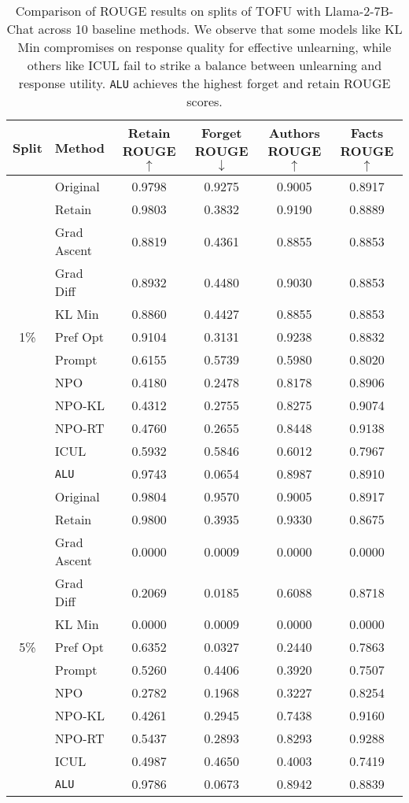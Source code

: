 \begin{table*}
    \centering
    \caption{Comparison of ROUGE results on splits of TOFU with Llama-2-7B-Chat across 10 baseline methods. We observe that some models like KL Min compromises on response quality for effective unlearning, while others like ICUL fail to strike a balance between unlearning and response utility. \texttt{ALU} achieves the highest forget and retain ROUGE scores.}
    \begin{tabular}{cl|cccc}
    \toprule
    \textbf{Split}&\textbf{Method}&\textbf{Retain ROUGE} $\uparrow$ &\textbf{Forget ROUGE} $\downarrow$ &\textbf{Authors ROUGE} $\uparrow$ &\textbf{Facts ROUGE} $\uparrow$ \\
    \midrule
    & Original & 0.9798 & 0.9275 & 0.9005 & 0.8917\\
    & Retain & 0.9803 & 0.3832 & 0.9190 & 0.8889\\
    & Grad Ascent & 0.8819 & 0.4361 & 0.8855 & 0.8853\\
    & Grad Diff & 0.8932 & 0.4480 & 0.9030 & 0.8853\\
    & KL Min & 0.8860 & 0.4427 & 0.8855 & 0.8853\\
    1\% & Pref Opt & 0.9104 & 0.3131 & 0.9238 & 0.8832\\
    & Prompt & 0.6155 & 0.5739 & 0.5980 & 0.8020\\
    & NPO & 0.4180 & 0.2478 & 0.8178 & 0.8906\\
    & NPO-KL & 0.4312 & 0.2755 & 0.8275 & 0.9074\\
    & NPO-RT & 0.4760 & 0.2655 & 0.8448 & 0.9138\\
    & ICUL & 0.5932 & 0.5846 & 0.6012 & 0.7967\\
    & \texttt{ALU} & 0.9743 & 0.0654 & 0.8987 & 0.8910\\
    \midrule
    & Original & 0.9804 & 0.9570 & 0.9005 & 0.8917\\
    & Retain & 0.9800 & 0.3935 & 0.9330 & 0.8675\\
    & Grad Ascent & 0.0000 & 0.0009 & 0.0000 & 0.0000\\
    & Grad Diff & 0.2069 & 0.0185 & 0.6088 & 0.8718\\
    & KL Min & 0.0000 & 0.0009 & 0.0000 & 0.0000\\
    5\% & Pref Opt & 0.6352 & 0.0327 & 0.2440 & 0.7863\\
    & Prompt & 0.5260 & 0.4406 & 0.3920 & 0.7507\\
    & NPO & 0.2782 & 0.1968 & 0.3227 & 0.8254\\
    & NPO-KL & 0.4261 & 0.2945 & 0.7438 & 0.9160\\
    & NPO-RT & 0.5437 & 0.2893 & 0.8293 & 0.9288\\
    & ICUL & 0.4987 & 0.4650 & 0.4003 & 0.7419\\
    & \texttt{ALU} & 0.9786 & 0.0673 & 0.8942 & 0.8839\\
    \bottomrule
    \end{tabular}
    \label{tab:t30}
\end{table*}


